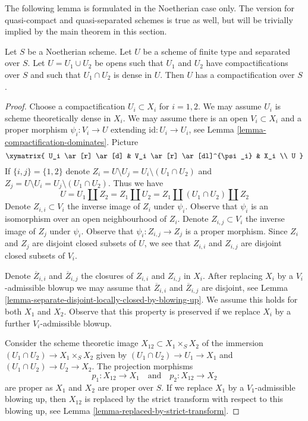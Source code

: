 \noindent
The following lemma is formulated in the Noetherian case only.
The version for quasi-compact and quasi-separated schemes is
true as well, but will be trivially implied by the main
theorem in this section.

\begin{lemma}
\label{lemma-two-compactifications}
Let $S$ be a Noetherian scheme. Let $U$ be a scheme of finite type
and separated over $S$. Let $U = U_1 \cup U_2$ be opens such that
$U_1$ and $U_2$ have compactifications over $S$ and such that
$U_1 \cap U_2$ is dense in $U$. Then $U$ has a compactification over $S$.
\end{lemma}

\begin{proof}
Choose a compactification $U_i \subset X_i$ for $i = 1, 2$. We may
assume $U_i$ is scheme theoretically dense in $X_i$. We may assume there
is an open $V_i \subset X_i$ and a proper morphism
$\psi_i : V_i \to U$ extending $\text{id} : U_i \to U_i$, see
Lemma \ref{lemma-compactification-dominates}. Picture
$$
\xymatrix{
U_i \ar[r] \ar[d] & V_i \ar[r] \ar[dl]^{\psi_i} & X_i \\
U
}
$$
If $\{i, j\} = \{1, 2\}$ denote
$Z_i = U \setminus U_j = U_i \setminus (U_1 \cap U_2)$
and
$Z_j = U \setminus U_i = U_j \setminus (U_1 \cap U_2)$.
Thus we have
$$
U = U_1 \amalg Z_2 = Z_1 \amalg U_2 = Z_1 \amalg (U_1 \cap U_2) \amalg Z_2
$$
Denote $Z_{i, i} \subset V_i$ the inverse image of $Z_i$ under $\psi_i$.
Observe that $\psi_i$ is an isomorphism over an open neighbourhood of $Z_i$.
Denote $Z_{i, j} \subset V_i$ the inverse image of $Z_j$ under $\psi_i$.
Observe that $\psi_i : Z_{i, j} \to Z_j$ is a proper morphism.
Since $Z_i$ and $Z_j$ are disjoint closed subsets of
$U$, we see that $Z_{i, i}$ and $Z_{i, j}$ are disjoint closed subsets
of $V_i$.

\medskip\noindent
Denote $\overline{Z}_{i, i}$ and $\overline{Z}_{i, j}$ the closures of
$Z_{i, i}$ and $Z_{i, j}$ in $X_i$. After replacing $X_i$ by a
$V_i$-admissible blowup we may assume that
$\overline{Z}_{i, i}$ and $\overline{Z}_{i, j}$ are disjoint, see
Lemma \ref{lemma-separate-disjoint-locally-closed-by-blowing-up}.
We assume this holds for both $X_1$ and $X_2$.
Observe that this property is preserved if we replace $X_i$
by a further $V_i$-admissible blowup.

\medskip\noindent
Consider the scheme theoretic image $X_{12} \subset X_1 \times_S X_2$
of the immersion $(U_1 \cap U_2) \to X_1 \times_S X_2$ given by
$(U_1 \cap U_2) \to U_1 \to X_1$ and $(U_1 \cap U_2) \to U_2 \to X_2$.
The projection morphisms
$$
p_1 : X_{12} \to X_1
\quad\text{and}\quad
p_2 : X_{12} \to X_2
$$
are proper as $X_1$ and $X_2$ are proper over $S$. If we replace $X_1$ by a
$V_1$-admissible blowing up, then $X_{12}$ is replaced by
the strict transform with respect to this blowing up, see
Lemma \ref{lemma-replaced-by-strict-transform}.


\end{proof}
